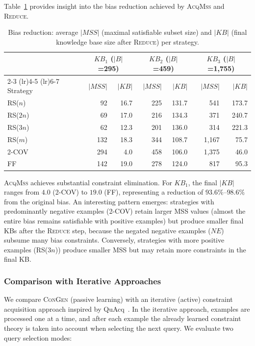 Table~\ref{tab:kb_size} provides insight into the bias reduction achieved by \textsc{AcqMss} and \textsc{Reduce}.

\begin{table}[htbp]
\centering
\caption{Bias reduction: average $|MSS|$ (maximal satisfiable subset size) and $|KB|$ (final knowledge base size after \textsc{Reduce}) per strategy.}
\label{tab:kb_size}
\begin{tabular}{lrrrrrr}
\toprule
 & \multicolumn{2}{c}{$KB_1$ ($|B|$=295)} & \multicolumn{2}{c}{$KB_2$ ($|B|$=459)} & \multicolumn{2}{c}{$KB_3$ ($|B|$=1{,}755)} \\
\cmidrule(lr){2-3} \cmidrule(lr){4-5} \cmidrule(lr){6-7}
Strategy & $|MSS|$ & $|KB|$ & $|MSS|$ & $|KB|$ & $|MSS|$ & $|KB|$ \\
\midrule
RS($n$)  &  92 & 16.7 & 225 & 131.7 &  541 & 173.7 \\
RS($2n$) &  69 & 17.0 & 216 & 134.3 &  371 & 240.7 \\
RS($3n$) &  62 & 12.3 & 201 & 136.0 &  314 & 221.3 \\
RS($m$)  & 132 & 18.3 & 344 & 108.7 & 1{,}167 &  75.7 \\
2-COV    & 294 &  4.0 & 458 & 106.0 & 1{,}375 &  46.0 \\
FF       & 142 & 19.0 & 278 & 124.0 &  817 &  95.3 \\
\bottomrule
\end{tabular}
\end{table}

\textsc{AcqMss} achieves substantial constraint elimination. For $KB_1$, the final $|KB|$ ranges from $4.0$ (2-COV) to $19.0$ (FF), representing a reduction of $93.6\%$--$98.6\%$ from the original bias. An interesting pattern emerges: strategies with predominantly negative examples (2-COV) retain larger MSS values (almost the entire bias remains satisfiable with positive examples) but produce smaller final KBs after the \textsc{Reduce} step, because the negated negative examples ($NE$) subsume many bias constraints. Conversely, strategies with more positive examples (RS($3n$)) produce smaller MSS but may retain more constraints in the final KB.


\subsubsection{Comparison with Iterative Approaches}

We compare \textsc{ConGen} (passive learning) with an iterative (active) constraint acquisition approach inspired by QuAcq~\cite{bessiere2013}. In the iterative approach, examples are processed one at a time, and after each example the already learned constraint theory is taken into account when selecting the next query. We evaluate two query selection modes:

